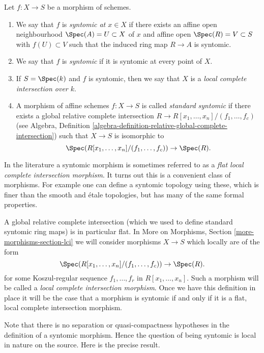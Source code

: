 \begin{definition}
\label{definition-syntomic}
Let $f : X \to S$ be a morphism of schemes.
\begin{enumerate}
\item We say that $f$ is {\it syntomic at $x \in X$} if
there exists an affine open neighbourhood $\Spec(A) = U \subset X$
of $x$ and affine open $\Spec(R) = V \subset S$
with $f(U) \subset V$ such that the induced ring map
$R \to A$ is syntomic.
\item We say that $f$ is {\it syntomic} if it is syntomic
at every point of $X$.
\item If $S = \Spec(k)$ and $f$ is syntomic, then we say that
$X$ is a {\it local complete intersection over $k$}.
\item A morphism of affine schemes $f : X \to S$
is called {\it standard syntomic} if there exists a
global relative complete intersection
$R \to R[x_1, \ldots, x_n]/(f_1, \ldots, f_c)$ (see
Algebra,
Definition \ref{algebra-definition-relative-global-complete-intersection})
such that $X \to S$ is isomorphic to
$$
\Spec(R[x_1, \ldots, x_n]/(f_1, \ldots, f_c)) \to \Spec(R).
$$
\end{enumerate}
\end{definition}

\noindent
In the literature a syntomic morphism is sometimes referred to as a
{\it flat local complete intersection morphism}.
It turns out this is a convenient class of morphisms. For example one
can define a syntomic topology using these, which is finer than the
smooth and \'etale topologies, but has many of the same formal properties.

\medskip\noindent
A global relative complete intersection (which we used to define standard
syntomic ring maps) is in particular flat. In
More on Morphisms, Section \ref{more-morphisms-section-lci}
we will consider morphisms $X \to S$ which locally are of the form
$$
\Spec(R[x_1, \ldots, x_n]/(f_1, \ldots, f_c)) \to \Spec(R).
$$
for some Koszul-regular sequence $f_1, \ldots, f_r$ in $R[x_1, \ldots, x_n]$.
Such a morphism will be called a {\it local complete intersection morphism}.
Once we have this definition in place it will be the case that a morphism
is syntomic if and only if it is a flat, local complete intersection morphism.

\medskip\noindent
Note that there is no separation or quasi-compactness hypotheses in the
definition of a syntomic morphism. Hence the question of being syntomic
is local in nature on the source. Here is the precise result.


